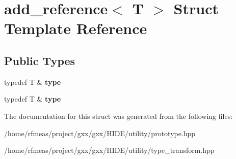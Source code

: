 \hypertarget{structadd__reference}{}\section{add\+\_\+reference$<$ T $>$ Struct Template Reference}
\label{structadd__reference}
\subsection*{Public Types}
\begin{DoxyCompactItemize}
\item 
typedef T \& {\bfseries type}\hypertarget{structadd__reference_a88554e5d1310b7c49702008e37e5c38e}{}\label{structadd__reference_a88554e5d1310b7c49702008e37e5c38e}

\item 
typedef T \& {\bfseries type}\hypertarget{structadd__reference_a88554e5d1310b7c49702008e37e5c38e}{}\label{structadd__reference_a88554e5d1310b7c49702008e37e5c38e}

\end{DoxyCompactItemize}


The documentation for this struct was generated from the following files\+:\begin{DoxyCompactItemize}
\item 
/home/rfmeas/project/gxx/gxx/\+H\+I\+D\+E/utility/prototype.\+hpp\item 
/home/rfmeas/project/gxx/gxx/\+H\+I\+D\+E/utility/type\+\_\+transform.\+hpp\end{DoxyCompactItemize}
